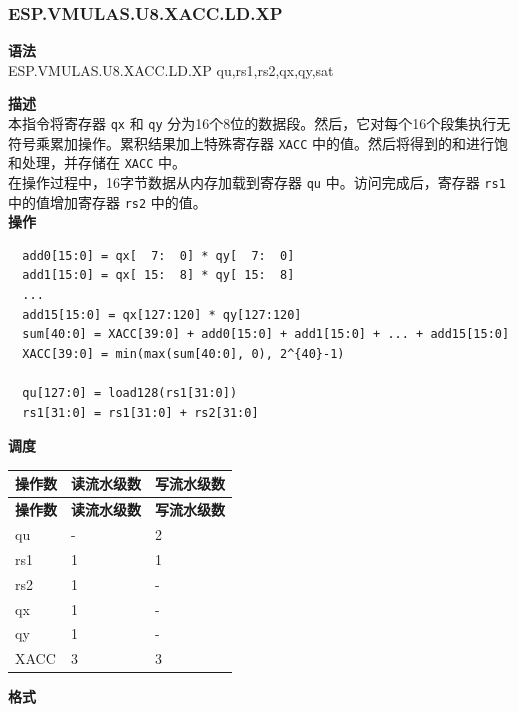 \newpage

\newpage
\subsubsection{ESP.VMULAS.U8.XACC.LD.XP}\label{instruction:ESPVMULASU8XACCLDXP}
\textbf{语法}\\
ESP.VMULAS.U8.XACC.LD.XP qu,rs1,rs2,qx,qy,sat

\textbf{描述}\\
本指令将寄存器 \lstinline{qx} 和 \lstinline{qy} 分为16个8位的数据段。然后，它对每个16个段集执行无符号乘累加操作。累积结果加上特殊寄存器 \lstinline{XACC} 中的值。然后将得到的和进行饱和处理，并存储在 \lstinline{XACC} 中。\\
在操作过程中，16字节数据从内存加载到寄存器 \lstinline{qu} 中。访问完成后，寄存器 \lstinline{rs1} 中的值增加寄存器 \lstinline{rs2} 中的值。\\
\textbf{操作}
\begin{lstlisting}
  add0[15:0] = qx[  7:  0] * qy[  7:  0]
  add1[15:0] = qx[ 15:  8] * qy[ 15:  8]
  ...
  add15[15:0] = qx[127:120] * qy[127:120]
  sum[40:0] = XACC[39:0] + add0[15:0] + add1[15:0] + ... + add15[15:0]
  XACC[39:0] = min(max(sum[40:0], 0), 2^{40}-1)

  qu[127:0] = load128(rs1[31:0])
  rs1[31:0] = rs1[31:0] + rs2[31:0]
\end{lstlisting}

\textbf{调度}\\
\begin{longtable}[c]{|l|l|l|}
    \hline
    \rowcolor{lightgray}
    \textbf{操作数} & \textbf{读流水级数} & \textbf{写流水级数} \\\hline
    \endfirsthead
    \hline
    \rowcolor{lightgray}
     \textbf{操作数} & \textbf{读流水级数} & \textbf{写流水级数} \\\hline
    \endhead
    \hline
    \endfoot

    qu & - & 2 \\\hline
    rs1 & 1 & 1 \\\hline
    rs2 & 1 & - \\\hline
     qx & 1 & - \\\hline
     qy & 1 & - \\\hline
     XACC & 3 & 3

\end{longtable}

\textbf{格式}\\

